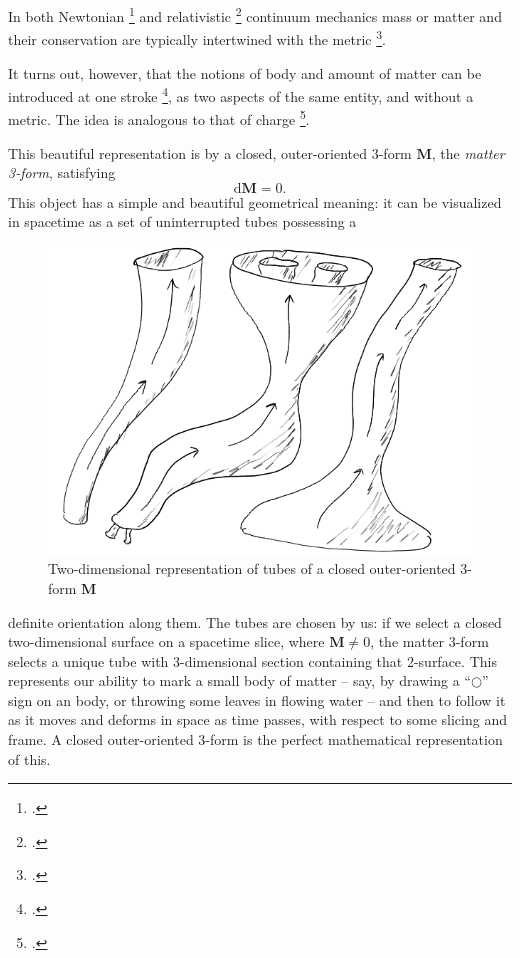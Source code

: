 \documentclass[\ifafour a4paper,12pt,\else a5paper,10pt,\fi%
onecolumn,oneside,article,%
british%
]{memoir}
\theoremstyle{remark}
\theoremstyle{innote}
\newcommand*{\citep}{\footcites}
\newcommand*{\di}{\mathrm{d}}%
\renewcommand*{\|}[1][]{\nonscript\,#1\vert\nonscript\;\mathopen{}}
\newcommand*{\sect}{\S}%
\newcommand*{\sects}{\S\S}%
\newcommand*{\chap}{ch.}%
\newcommand*{\cf}{{cf.}}
\newcommand*{\yrr}{M}
\newcommand*{\yr}{\bm{\yrr}}
\begin{document}
\medskip

In both Newtonian
\citep[\sects~I.4]{truesdell1977_r1991}{noll1959,noll1973} and relativistic
\citep{grotetal1966}[\chap~3]{rezzollaetal2013} continuum mechanics mass or
matter and their conservation are typically intertwined with the metric
\citep[being an exception]{carteretal1972}.

It turns out, however, that the notions of body and amount of matter can be
introduced at one stroke \citep[\cf][]{carteretal1972}, as two aspects of
the same entity, and without a metric. The idea is analogous to that of
charge
\citep{burke1983,bossavit1998b,hehletal2000}[\sect~B.1]{hehletal2003}.

This beautiful representation is by a closed, outer-oriented 3-form $\yr$,
the \emph{matter 3-form}, satisfying
\begin{equation}
  \label{eq:mass_density_closed_three_form}
  \di\yr=0.
\end{equation}
This object has a simple and beautiful geometrical meaning: it can be
visualized in spacetime as a set of uninterrupted tubes possessing a %
\setlength{\intextsep}{0.0ex}%
\begin{figure}
  \includegraphics[width=\linewidth]{mass_tubes2.png}\\
  \centering\footnotesize Two-dimensional representation of tubes of a
  closed outer-oriented 3-form $\yr$
\end{figure}
definite orientation along them. The tubes are chosen by us: if we select a
closed two-dimensional surface on a spacetime slice, where $\yr \ne 0$, the
matter 3-form selects a unique tube with 3-dimensional section containing
that 2-surface. This represents our ability to mark a small
body of matter -- say, by drawing a \enquote{$\mathord{\bigcirc}$} sign on
an body, or throwing some %
leaves in flowing water -- and then to follow it
as it moves and deforms %
in space as time passes, with respect to some
slicing and frame. A closed %
outer-oriented 3-form is the perfect
mathematical representation of this.
\end{document}
